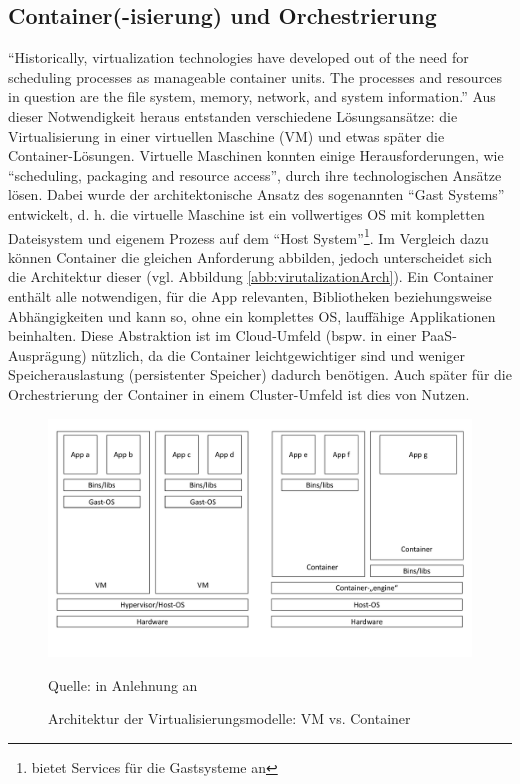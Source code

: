 \subsection{Container(-isierung) und Orchestrierung}
\enquote{Historically, virtualization technologies have developed out of the need for scheduling processes as manageable container units. The processes and resources in question are the file system, memory, network, and system information.}\autocite[][S.25]{pahl_containerization_2015} Aus dieser Notwendigkeit heraus entstanden verschiedene Lösungsansätze: die Virtualisierung in einer virtuellen Maschine (\ac*{VM}) und etwas später die Container-Lösungen. Virtuelle Maschinen konnten einige Herausforderungen, wie \enquote{scheduling, packaging and resource access}, durch ihre technologischen Ansätze lösen. Dabei wurde der architektonische Ansatz des sogenannten \enquote{Gast Systems} entwickelt, d. h. die virtuelle Maschine ist ein vollwertiges \ac{OS} mit kompletten Dateisystem und eigenem Prozess auf dem \enquote{Host System}\footnote{bietet Services für die Gastsysteme an}. Im Vergleich dazu können Container die gleichen Anforderung abbilden, jedoch unterscheidet sich die Architektur dieser (vgl. Abbildung \vref{abb:virutalizationArch}). Ein Container enthält alle notwendigen, für die App relevanten, Bibliotheken beziehungsweise Abhängigkeiten und kann so, ohne ein komplettes \ac{OS}, lauffähige Applikationen beinhalten. Diese Abstraktion ist im Cloud-Umfeld (bspw. in einer \ac{PaaS}-Ausprägung) nützlich, da die Container leichtgewichtiger sind und weniger Speicherauslastung (persistenter Speicher) dadurch benötigen. Auch später für die Orchestrierung der Container in einem Cluster-Umfeld ist dies von Nutzen. 

\begin{figure}[H]
	\centering
	\includegraphics[scale=0.44]{img/virtualization architecture.pdf}
	\caption{Architektur der Virtualisierungsmodelle: VM vs. Container}
	{\footnotesize Quelle: in Anlehnung an \cite{pahl_containerization_2015}}
	\label{abb:virutalizationArch}
\end{figure}




